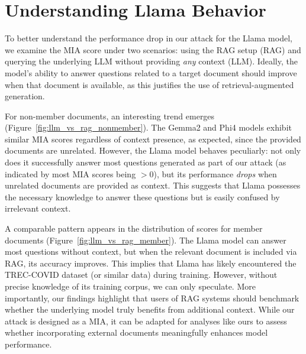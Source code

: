 \section{Understanding Llama Behavior}
\label{app:llama}

To better understand the performance drop in our attack for the Llama model, we examine the MIA score under two scenarios: using the RAG setup (RAG) and querying the underlying LLM without providing \textit{any} context (LLM). Ideally, the model's ability to answer questions related to a target document should improve when that document is available, as this justifies the use of retrieval-augmented generation.

For non-member documents, an interesting trend emerges (Figure~\ref{fig:llm_vs_rag_nonmember}). The Gemma2 and Phi4 models exhibit similar MIA scores regardless of context presence, as expected, since the provided documents are unrelated. However, the Llama model behaves peculiarly: not only does it successfully answer most questions generated as part of our attack (as indicated by most MIA scores being $>0$), but its performance \textit{drops} when unrelated documents are provided as context. This suggests that Llama possesses the necessary knowledge to answer these questions but is easily confused by irrelevant context.

A comparable pattern appears in the distribution of scores for member documents (Figure~\ref{fig:llm_vs_rag_member}). The Llama model can answer most questions without context, but when the relevant document is included via RAG, its accuracy improves. This implies that Llama has likely encountered the TREC-COVID dataset (or similar data) during training. However, without precise knowledge of its training corpus, we can only speculate. More importantly, our findings highlight that users of RAG systems should benchmark whether the underlying model truly benefits from additional context. While our attack is designed as a MIA, it can be adapted for analyses like ours to assess whether incorporating external documents meaningfully enhances model performance.
